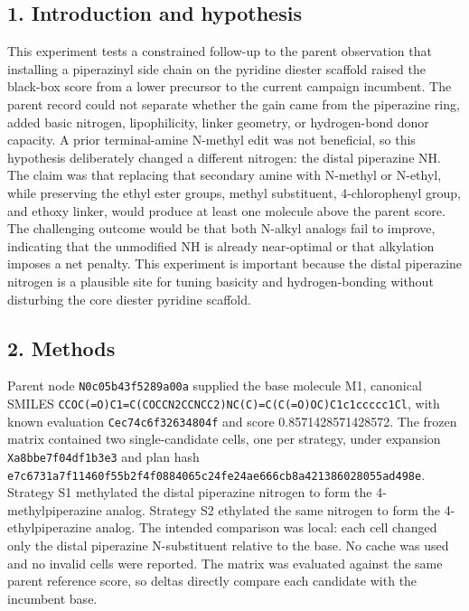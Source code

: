 \subsection*{1. Introduction and hypothesis}
This experiment tests a constrained follow-up to the parent observation that installing a piperazinyl side chain on the pyridine diester scaffold raised the black-box score from a lower precursor to the current campaign incumbent. The parent record could not separate whether the gain came from the piperazine ring, added basic nitrogen, lipophilicity, linker geometry, or hydrogen-bond donor capacity. A prior terminal-amine N-methyl edit was not beneficial, so this hypothesis deliberately changed a different nitrogen: the distal piperazine NH. The claim was that replacing that secondary amine with N-methyl or N-ethyl, while preserving the ethyl ester groups, methyl substituent, 4-chlorophenyl group, and ethoxy linker, would produce at least one molecule above the parent score. The challenging outcome would be that both N-alkyl analogs fail to improve, indicating that the unmodified NH is already near-optimal or that alkylation imposes a net penalty. This experiment is important because the distal piperazine nitrogen is a plausible site for tuning basicity and hydrogen-bonding without disturbing the core diester pyridine scaffold.

\subsection*{2. Methods}
Parent node \nolinkurl{N0c05b43f5289a00a} supplied the base molecule M1, canonical SMILES \nolinkurl{CCOC(=O)C1=C(COCCN2CCNCC2)NC(C)=C(C(=O)OC)C1c1ccccc1Cl}, with known evaluation \nolinkurl{Cec74c6f32634804f} and score 0.8571428571428572. The frozen matrix contained two single-candidate cells, one per strategy, under expansion \nolinkurl{Xa8bbe7f04df1b3e3} and plan hash \nolinkurl{e7c6731a7f11460f55b2f4f0884065c24fe24ae666cb8a421386028055ad498e}. Strategy S1 methylated the distal piperazine nitrogen to form the 4-methylpiperazine analog. Strategy S2 ethylated the same nitrogen to form the 4-ethylpiperazine analog. The intended comparison was local: each cell changed only the distal piperazine N-substituent relative to the base. No cache was used and no invalid cells were reported. The matrix was evaluated against the same parent reference score, so deltas directly compare each candidate with the incumbent base.

